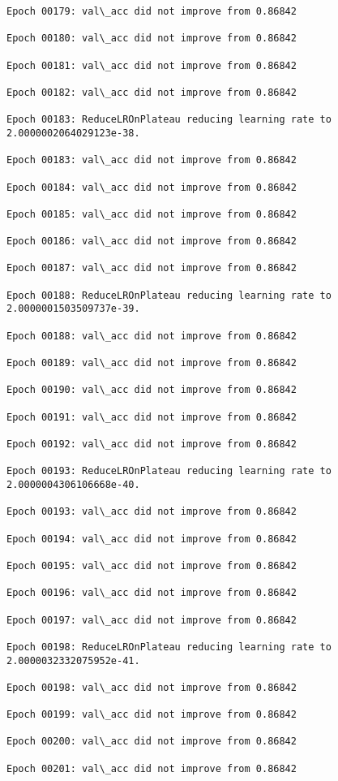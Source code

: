 \documentclass[11pt]{article}
\begin{document}
\begin{Verbatim}[commandchars=\\\{\}]
Epoch 00179: val\_acc did not improve from 0.86842

Epoch 00180: val\_acc did not improve from 0.86842

Epoch 00181: val\_acc did not improve from 0.86842

Epoch 00182: val\_acc did not improve from 0.86842

Epoch 00183: ReduceLROnPlateau reducing learning rate to 2.0000002064029123e-38.

Epoch 00183: val\_acc did not improve from 0.86842

Epoch 00184: val\_acc did not improve from 0.86842

Epoch 00185: val\_acc did not improve from 0.86842

Epoch 00186: val\_acc did not improve from 0.86842

Epoch 00187: val\_acc did not improve from 0.86842

Epoch 00188: ReduceLROnPlateau reducing learning rate to 2.0000001503509737e-39.

Epoch 00188: val\_acc did not improve from 0.86842

Epoch 00189: val\_acc did not improve from 0.86842

Epoch 00190: val\_acc did not improve from 0.86842

Epoch 00191: val\_acc did not improve from 0.86842

Epoch 00192: val\_acc did not improve from 0.86842

Epoch 00193: ReduceLROnPlateau reducing learning rate to 2.0000004306106668e-40.

Epoch 00193: val\_acc did not improve from 0.86842

Epoch 00194: val\_acc did not improve from 0.86842

Epoch 00195: val\_acc did not improve from 0.86842

Epoch 00196: val\_acc did not improve from 0.86842

Epoch 00197: val\_acc did not improve from 0.86842

Epoch 00198: ReduceLROnPlateau reducing learning rate to 2.0000032332075952e-41.

Epoch 00198: val\_acc did not improve from 0.86842

Epoch 00199: val\_acc did not improve from 0.86842

Epoch 00200: val\_acc did not improve from 0.86842

Epoch 00201: val\_acc did not improve from 0.86842


\end{Verbatim}
\end{document}
